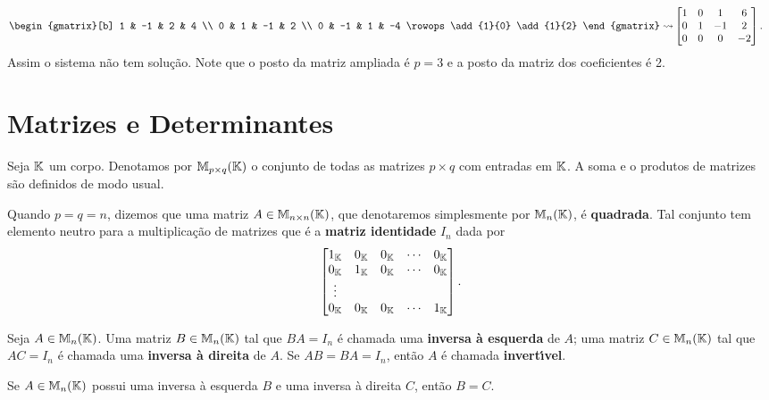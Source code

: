 \begin{exemplo}
\begin{enumerate}
\begin{solucao}
\begin{align*}
\begin{gmatrix}[b]
	1 & -1 & 2 & 4 \\
	0 & 1 & -1 & 2 \\
	0 & -1 & 1 & -4 
	\rowops
	\add{1}{0}
	\add{1}{2}
	\end{gmatrix}\leadsto&\begin{bmatrix}
	1 & 0 & 1 & 6 \\
	0 & 1 & -1 & 2 \\
	0 & 0 & 0 & -2 
	\end{bmatrix}.
	\end{align*}
	Assim o sistema n\~ao tem solu\c{c}\~ao. Note que o posto da matriz ampliada \'e $p = 3$ e a posto da matriz dos coeficientes \'e 2.
	\end{solucao}
\end{enumerate}
\end{exemplo}

\section{Matrizes e Determinantes}

Seja $\mathbb{K}$ um corpo. Denotamos por $\mathbb{M}_{p \times q}(\mathbb{K})$ o conjunto de todas as matrizes $p \times q$ com entradas em $\mathbb{K}$. A soma e o produtos de matrizes s\~ao definidos de modo usual.

Quando $p = q = n$, dizemos que uma matriz $A \in \mathbb{M}_{n \times n}(\mathbb{K})$, que denotaremos simplesmente por $\mathbb{M}_{n}(\mathbb{K})$, \'e \textbf{quadrada}.
Tal conjunto tem elemento neutro para a multiplica\c{c}\~ao de matrizes que \'e a \textbf{matriz identidade} $I_n$ dada por
\[
\begin{bmatrix}
1_{\mathbb{K}} & 0_{\mathbb{K}} & 0_{\mathbb{K}} & \cdots & 0_{\mathbb{K}}\\
0_{\mathbb{K}} & 1_{\mathbb{K}} & 0_{\mathbb{K}} & \cdots & 0_{\mathbb{K}}\\
\vdots\\
0_{\mathbb{K}} & 0_{\mathbb{K}} & 0_{\mathbb{K}} & \cdots & 1_{\mathbb{K}}
\end{bmatrix}.
\]

\begin{definicao}
Seja $A \in \mathbb{M}_{n}(\mathbb{K})$. Uma matriz $B \in \mathbb{M}_{n}(\mathbb{K})$ tal que $BA = I_n$ \'e chamada uma \textbf{inversa \`a esquerda} de $A$; uma matriz $C \in \mathbb{M}_{n}(\mathbb{K})$ tal que $AC = I_n$ \'e chamada uma \textbf{inversa \`a direita} de $A$. Se $AB = BA = I_n$, ent\~ao $A$ \'e chamada \textbf{invert{\'\i}vel}.
\end{definicao}

\begin{proposicao}
Se $A \in \mathbb{M}_{n}(\mathbb{K})$ possui uma inversa \`a esquerda $B$ e uma inversa \`a direita $C$, ent\~ao $B = C$.
\end{proposicao}

